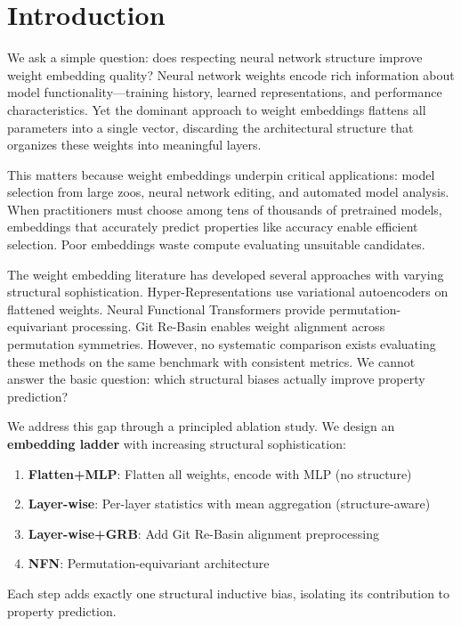 \section{Introduction}

We ask a simple question: does respecting neural network structure improve weight embedding quality? Neural network weights encode rich information about model functionality---training history, learned representations, and performance characteristics. Yet the dominant approach to weight embeddings flattens all parameters into a single vector, discarding the architectural structure that organizes these weights into meaningful layers.

This matters because weight embeddings underpin critical applications: model selection from large zoos, neural network editing, and automated model analysis. When practitioners must choose among tens of thousands of pretrained models, embeddings that accurately predict properties like accuracy enable efficient selection. Poor embeddings waste compute evaluating unsuitable candidates.

The weight embedding literature has developed several approaches with varying structural sophistication. Hyper-Representations use variational autoencoders on flattened weights. Neural Functional Transformers provide permutation-equivariant processing. Git Re-Basin enables weight alignment across permutation symmetries. However, no systematic comparison exists evaluating these methods on the same benchmark with consistent metrics. We cannot answer the basic question: which structural biases actually improve property prediction?

We address this gap through a principled ablation study. We design an \textbf{embedding ladder} with increasing structural sophistication:

\begin{enumerate}
    \item \textbf{Flatten+MLP}: Flatten all weights, encode with MLP (no structure)
    \item \textbf{Layer-wise}: Per-layer statistics with mean aggregation (structure-aware)
    \item \textbf{Layer-wise+GRB}: Add Git Re-Basin alignment preprocessing
    \item \textbf{NFN}: Permutation-equivariant architecture
\end{enumerate}

Each step adds exactly one structural inductive bias, isolating its contribution to property prediction.

